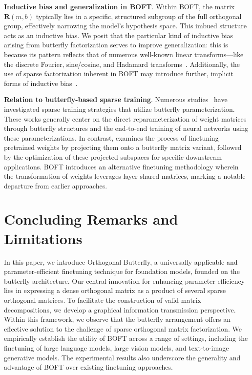 \textbf{Inductive bias and generalization in BOFT}. Within BOFT, the matrix $\bm{R}(m,b)$ typically lies in a specific, structured subgroup of the full orthogonal group, effectively narrowing the model's hypothesis space. This imbued structure acts as an inductive bias. We posit that the particular kind of inductive bias arising from butterfly factorization serves to improve generalization: this is because its pattern reflects that of numerous well-known linear transforms—like the discrete Fourier, sine/cosine, and Hadamard transforms~\cite{dao2019kaleidoscope}. Additionally, the use of sparse factorization inherent in BOFT may introduce further, implicit forms of inductive bias~\cite{gunasekar2017implicit,li2018algorithmic,liu2019neural}.

\textbf{Relation to butterfly-based sparse training}. Numerous studies~\cite{dao2019learning,dao2019kaleidoscope,chen2022pixelated,dao2022monarch} have investigated sparse training strategies that utilize butterfly parameterization. These works generally center on the direct reparameterization of weight matrices through butterfly structures and the end-to-end training of neural networks using these parameterizations. In contrast, \cite{dao2022monarch} examines the process of finetuning pretrained weights by projecting them onto a butterfly matrix variant, followed by the optimization of these projected subspaces for specific downstream applications. BOFT introduces an alternative finetuning methodology wherein the transformation of weights leverages layer-shared matrices, marking a notable departure from earlier approaches.



\section{Concluding Remarks and Limitations}

In this paper, we introduce Orthogonal Butterfly, a universally applicable and parameter-efficient finetuning technique for foundation models, founded on the butterfly architecture. Our central innovation for enhancing parameter-efficiency lies in expressing a dense orthogonal matrix as a product of several sparse orthogonal matrices. To facilitate the construction of valid matrix decompositions, we develop a graphical information transmission perspective. Within this framework, we observe that the butterfly arrangement offers an effective solution to the challenge of sparse orthogonal matrix factorization. We empirically establish the utility of BOFT across a range of settings, including the finetuning of large language models, large vision models, and text-to-image generative models. The experimental results also underscore the generality and advantage of BOFT over existing finetuning approaches.

